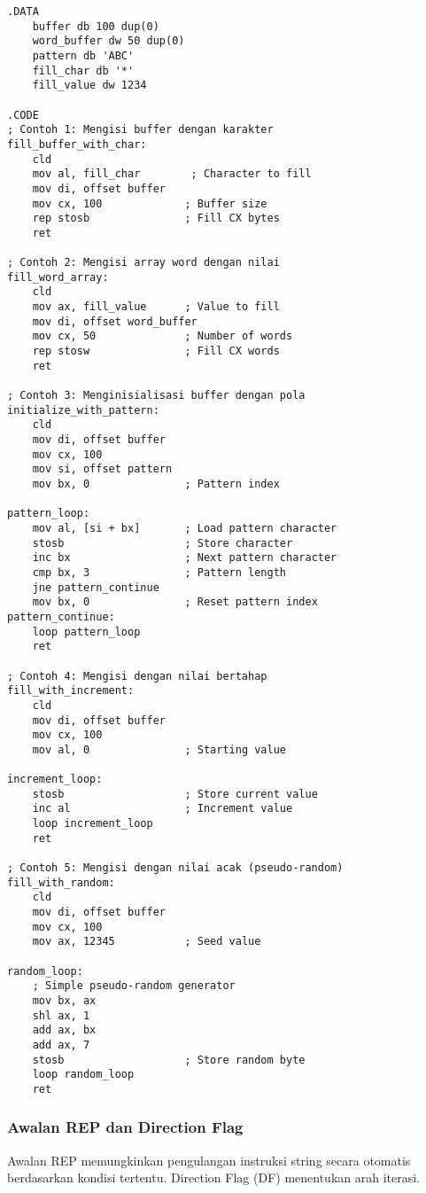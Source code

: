 \documentclass[../main.tex]{subfiles}
\begin{document}
                \begin{lstlisting}[language={[x86masm]Assembler}, caption=Contoh Instruksi STOS, label={lst:stos-examples}]
.DATA
    buffer db 100 dup(0)
    word_buffer dw 50 dup(0)
    pattern db 'ABC'
    fill_char db '*'
    fill_value dw 1234

.CODE
; Contoh 1: Mengisi buffer dengan karakter
fill_buffer_with_char:
    cld
    mov al, fill_char        ; Character to fill
    mov di, offset buffer
    mov cx, 100             ; Buffer size
    rep stosb               ; Fill CX bytes
    ret

; Contoh 2: Mengisi array word dengan nilai
fill_word_array:
    cld
    mov ax, fill_value      ; Value to fill
    mov di, offset word_buffer
    mov cx, 50              ; Number of words
    rep stosw               ; Fill CX words
    ret

; Contoh 3: Menginisialisasi buffer dengan pola
initialize_with_pattern:
    cld
    mov di, offset buffer
    mov cx, 100
    mov si, offset pattern
    mov bx, 0               ; Pattern index
    
pattern_loop:
    mov al, [si + bx]       ; Load pattern character
    stosb                   ; Store character
    inc bx                  ; Next pattern character
    cmp bx, 3               ; Pattern length
    jne pattern_continue
    mov bx, 0               ; Reset pattern index
pattern_continue:
    loop pattern_loop
    ret

; Contoh 4: Mengisi dengan nilai bertahap
fill_with_increment:
    cld
    mov di, offset buffer
    mov cx, 100
    mov al, 0               ; Starting value
    
increment_loop:
    stosb                   ; Store current value
    inc al                  ; Increment value
    loop increment_loop
    ret

; Contoh 5: Mengisi dengan nilai acak (pseudo-random)
fill_with_random:
    cld
    mov di, offset buffer
    mov cx, 100
    mov ax, 12345           ; Seed value
    
random_loop:
    ; Simple pseudo-random generator
    mov bx, ax
    shl ax, 1
    add ax, bx
    add ax, 7
    stosb                   ; Store random byte
    loop random_loop
    ret
                \end{lstlisting}

            \subsubsection{Awalan REP dan Direction Flag}
                Awalan REP memungkinkan pengulangan instruksi string secara otomatis berdasarkan kondisi tertentu. Direction Flag (DF) menentukan arah iterasi.
\end{document}
